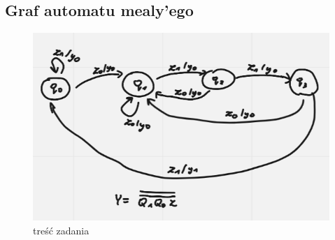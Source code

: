 \newpage

\subsection{Graf automatu mealy'ego}

\begin{figure}[h!]
    \centering
    \includegraphics[width=.55\textwidth]{images/graph/g_mealy.png}
    \caption{treść zadania}
    \label{fig:my_label}
\end{figure}